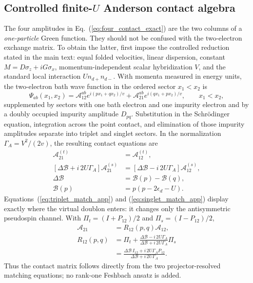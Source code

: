 \documentclass[%
  aps,physrev,onecolumn,10pt,amsmath,amssymb,superscriptaddress,longbibliography,floatfix
]{revtex4-2}
\begin{document}
\subsection{Controlled finite-\texorpdfstring{$U$}{U} Anderson contact
algebra}
\label{app:integrable_reduction}

The four amplitudes in Eq.~(\ref{eq:four_contact_exact}) are the two columns
of a \emph{one-particle} Green function.  They should not be confused with
the two-electron exchange matrix.  To obtain the latter, first impose the
controlled reduction stated in the main text: equal folded velocities,
linear dispersion, constant \(M=D\sigma_z+iG\sigma_x\),
momentum-independent scalar hybridization \(V\), and the standard local
interaction \(U n_{d+}n_{d-}\).  With momenta measured in energy units, the
two-electron bath wave function in the ordered sector \(x_1<x_2\) is
\begin{equation}
\Psi_{ab}(x_1,x_2)=\mathcal A_{12}^{ab}e^{i(px_1+qx_2)/v}
+\mathcal A_{21}^{ab}e^{i(qx_1+px_2)/v},\qquad x_1<x_2,
\label{eq:two_electron_ansatz_app}
\end{equation}
supplemented by sectors with one bath electron and one impurity electron and
by a doubly occupied impurity amplitude \(D_{pq}\).  Substitution in the
Schr\"odinger equation, integration across the point contact, and elimination
of those impurity amplitudes separate into triplet and singlet sectors.  In
the normalization
\(\Gamma_A=V^2/(2v)\), the resulting contact equations are
~\cite{Wiegmann1980,KawakamiOkiji1982,WiegmannTsvelick1983,
ChaoPalacios2011}
\begin{align}
\mathcal A_{21}^{(t)}&=\mathcal A_{12}^{(t)},\label{eq:triplet_match_app}\\
\left[\Delta\mathcal B+i\,2U\Gamma_A\right]\mathcal A_{21}^{(s)}
&=\left[\Delta\mathcal B-i\,2U\Gamma_A\right]\mathcal A_{12}^{(s)},
\label{eq:singlet_match_app}\\
\Delta\mathcal B&=\mathcal B(p)-\mathcal B(q),\nonumber\\
\mathcal B(p)&=p(p-2\epsilon_d-U).
\label{eq:B_def_app}
\end{align}
Equations~(\ref{eq:triplet_match_app}) and
(\ref{eq:singlet_match_app}) display exactly where the virtual doublon
enters: it changes only the antisymmetric pseudospin channel.  With
\(\Pi_t=(I+P_{12})/2\) and \(\Pi_s=(I-P_{12})/2\),
\begin{align}
\mathcal A_{21}&=R_{12}(p,q)\mathcal A_{12},\nonumber\\
R_{12}(p,q)
&=\Pi_t+
\frac{\Delta\mathcal B-i\,2U\Gamma_A}
     {\Delta\mathcal B+i\,2U\Gamma_A}\Pi_s
\nonumber\\
&=\frac{\Delta\mathcal B\,I_{12}
       +i\,2U\Gamma_A P_{12}}
      {\Delta\mathcal B+i\,2U\Gamma_A}.
\label{eq:Anderson_R_app}
\end{align}
Thus the contact matrix follows directly from the two projector-resolved
matching equations; no rank-one Feshbach ansatz is added.
\end{document}
